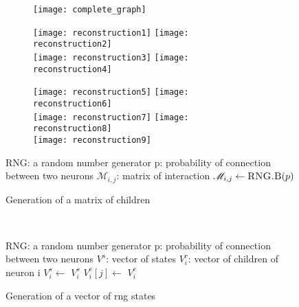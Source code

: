 \documentclass{report}
\begin{document}
	\begin{figure}
		\begin{subfigure}{\textwidth}
			\centering\texttt{[image: complete\_graph]}
		\end{subfigure}
		\begin{subfigure}{\textwidth}
			\centering\texttt{[image: reconstruction1]}
			\centering\texttt{[image: reconstruction2]}\\
			\centering\texttt{[image: reconstruction3]}
			\centering\texttt{[image: reconstruction4]}\\
		\end{subfigure}
		\begin{subfigure}{\textwidth}
			\centering\texttt{[image: reconstruction5]}
			\centering\texttt{[image: reconstruction6]}\\
			\centering\texttt{[image: reconstruction7]}
			\centering\texttt{[image: reconstruction8]}\\
			\centering\texttt{[image: reconstruction9]}
		\end{subfigure}
		\centering\begin{subalgorithm}{\textwidth}
			\begin{algorithmic}[1]
				\State RNG: a random number generator
				\State p: probability of connection between two neurons
				\State $\mathscr{M}_{i,j}$: matrix of interaction
						\State $\mathscr{M}_{i,j}\gets\Call{RNG.B}{p}$
					\EndFor
				\EndFunction
			\end{algorithmic}
			\caption{Generation of a matrix of children}\label{alg:mat}
		\end{subalgorithm}\\
		\centering\begin{subalgorithm}{\textwidth}
			\begin{algorithmic}[1]
				\State RNG: a random number generator
				\State p: probability of connection between two neurons
				\State $V^s$: vector of states
				\State $V^c_i$: vector of children of neuron i
						\State $V^s_i\gets$
							\State {}
						\EndFor
					\EndFor
					\RETURN $V^s_i$
				\EndFunction
					\State {}
						\State $V^c_i[j]\gets$
					\EndFor
					\RETURN $V^c_i$
				\EndFunction
			\end{algorithmic}
			\caption{Generation of a vector of rng states}\label{alg:vect}
		\end{subalgorithm}
	\end{figure}
\end{document}
